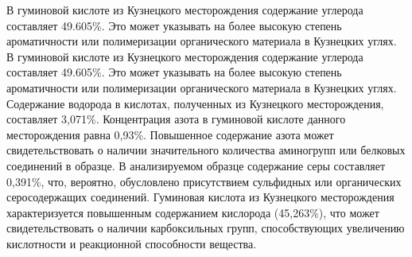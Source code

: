 % 

В гуминовой кислоте из Кузнецкого месторождения содержание углерода
составляет 49.605\%. Это может указывать на более высокую степень
ароматичности или полимеризации органического материала в Кузнецких
углях. В гуминовой кислоте из Кузнецкого месторождения содержание
углерода составляет 49.605\%. Это может указывать на более высокую
степень ароматичности или полимеризации органического материала в
Кузнецких углях. Содержание водорода в кислотах, полученных из
Кузнецкого месторождения, составляет 3,071\%. Концентрация азота в
гуминовой кислоте данного месторождения равна 0,93\%. Повышенное
содержание азота может свидетельствовать о наличии значительного
количества аминогрупп или белковых соединений в образце. В анализируемом
образце содержание серы составляет 0,391\%, что, вероятно, обусловлено
присутствием сульфидных или органических серосодержащих соединений.
Гуминовая кислота из Кузнецкого месторождения характеризуется повышенным
содержанием кислорода (45,263\%), что может свидетельствовать о наличии
карбоксильных групп, способствующих увеличению кислотности и реакционной
способности вещества.

